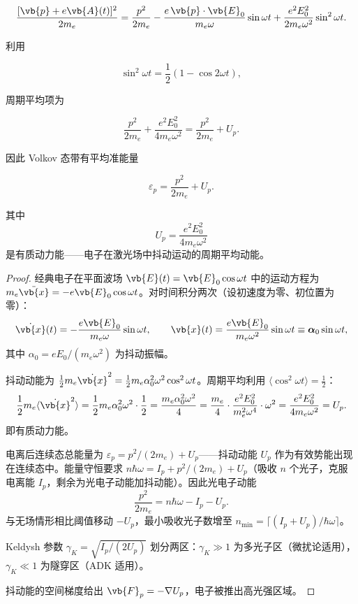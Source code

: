 \[
\frac{[\vb{p}+e\vb{A}(t)]^2}{2m_e}
=\frac{p^2}{2m_e}
-\frac{e\,\vb{p}\cdot\vb{E}_0}{m_e\omega}\sin\omega t
+\frac{e^2E_0^2}{2m_e\omega^2}\sin^2\omega t.
\]

利用

\[
\sin^2\omega t=\frac12(1-\cos2\omega t),
\]

周期平均项为

\[
\frac{p^2}{2m_e}+\frac{e^2E_0^2}{4m_e\omega^2}
=\frac{p^2}{2m_e}+U_p.
\]

因此 Volkov 态带有平均准能量

\[
\varepsilon_p=\frac{p^2}{2m_e}+U_p.
\]

其中
\begin{equation}
U_p=\frac{e^2E_0^2}{4m_e\omega^2}
\label{eq:ponderomotive-energy-restated}
\end{equation}
是有质动力能——电子在激光场中抖动运动的周期平均动能。

\begin{proof}
经典电子在平面波场 \(\vb{E}(t)=\vb{E}_0\cos\omega t\) 中的运动方程为 \(m_e\ddot{\vb{x}}=-e\vb{E}_0\cos\omega t\)。对时间积分两次（设初速度为零、初位置为零）：
\begin{equation*}
\dot{\vb{x}}(t)=-\frac{e\vb{E}_0}{m_e\omega}\sin\omega t,\qquad
\vb{x}(t)=\frac{e\vb{E}_0}{m_e\omega^2}\sin\omega t\equiv\boldsymbol\alpha_0\sin\omega t,
\end{equation*}
其中 \(\alpha_0=eE_0/(m_e\omega^2)\) 为抖动振幅。

抖动动能为 \(\frac{1}{2}m_e\dot{\vb{x}}^2=\frac{1}{2}m_e\alpha_0^2\omega^2\cos^2\omega t\)。周期平均利用 \(\langle\cos^2\omega t\rangle=\frac{1}{2}\)：
\begin{equation*}
\frac12 m_e\langle\dot{\vb{x}}^2\rangle
=\frac12 m_e\alpha_0^2\omega^2\cdot\frac12
=\frac{m_e\alpha_0^2\omega^2}{4}
=\frac{m_e}{4}\cdot\frac{e^2E_0^2}{m_e^2\omega^4}\cdot\omega^2
=\frac{e^2E_0^2}{4m_e\omega^2}
=U_p.
\end{equation*}
即有质动力能。

电离后连续态总能量为 \(\varepsilon_p=p^2/(2m_e)+U_p\)——抖动动能 \(U_p\) 作为有效势能出现在连续态中。能量守恒要求 \(n\hbar\omega=I_p+p^2/(2m_e)+U_p\)（吸收 \(n\) 个光子，克服电离能 \(I_p\)，剩余为光电子动能加抖动能）。因此光电子动能
\begin{equation*}
\frac{p^2}{2m_e}=n\hbar\omega-I_p-U_p.
\end{equation*}
与无场情形相比阈值移动 \(-U_p\)，最小吸收光子数增至 \(n_{\min}=\lceil(I_p+U_p)/\hbar\omega\rceil\)。

Keldysh 参数 \(\gamma_K=\sqrt{I_p/(2U_p)}\) 划分两区：\(\gamma_K\gg1\) 为多光子区（微扰论适用），\(\gamma_K\ll1\) 为隧穿区（ADK 适用）。

抖动能的空间梯度给出 \(\vb{F}_p=-\nabla U_p\)，电子被推出高光强区域。

\end{proof}

